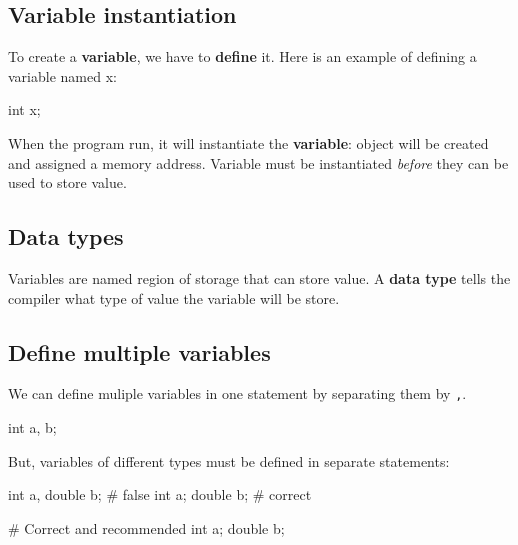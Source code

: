 \documentclass[
  letterpaper,
  DIV=11,
  numbers=noendperiod]{scrreprt}
\newenvironment{Shaded}{\begin{snugshade}}{\end{snugshade}}
\newcommand{\CommentTok}[1]{\textcolor[rgb]{0.37,0.37,0.37}{#1}}
\newcommand{\NormalTok}[1]{\textcolor[rgb]{0.00,0.23,0.31}{#1}}
\begin{document}
\hypertarget{variable-instantiation}{%
\subsection{Variable instantiation}\label{variable-instantiation}}

To create a \textbf{variable}, we have to \textbf{define} it. Here is an
example of defining a variable named x:

\begin{Shaded}
\begin{Highlighting}[]
\NormalTok{int x;}
\end{Highlighting}
\end{Shaded}

When the program run, it will instantiate the \textbf{variable}: object
will be created and assigned a memory address. Variable must be
instantiated \emph{before} they can be used to store value.

\hypertarget{data-types}{%
\subsection{Data types}\label{data-types}}

Variables are named region of storage that can store value. A
\textbf{data type} tells the compiler what type of value the variable
will be store.

\hypertarget{define-multiple-variables}{%
\subsection{Define multiple variables}\label{define-multiple-variables}}

We can define muliple variables in one statement by separating them by
\texttt{,}.

\begin{Shaded}
\begin{Highlighting}[]
\NormalTok{int a, b;}
\end{Highlighting}
\end{Shaded}

But, variables of different types must be defined in separate
statements:

\begin{Shaded}
\begin{Highlighting}[]
\NormalTok{int a, double b;  }\CommentTok{\# false}
\NormalTok{int a; double b;  }\CommentTok{\# correct}

\CommentTok{\# Correct and recommended}
\NormalTok{int a;}
\NormalTok{double b;}
\end{Highlighting}
\end{Shaded}
\end{document}
